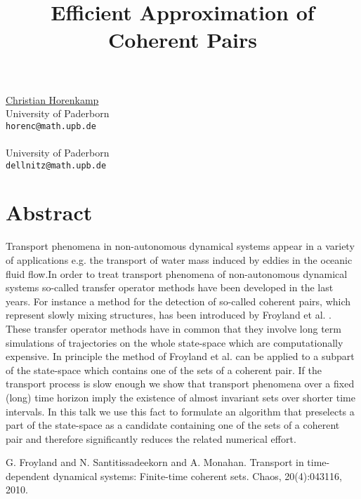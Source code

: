 \title{Efficient Approximation of Coherent Pairs}
\author{}  \institute{}
\maketitle
\begin{center}
{\large \underline{Christian Horenkamp}}\\
University of Paderborn\\
{\tt horenc@math.upb.de}
\\ \vspace{4mm}{\large Michael Dellnitz}\\
University of Paderborn\\
{\tt dellnitz@math.upb.de}

\end{center}

\section*{Abstract}

Transport phenomena in non-autonomous dynamical systems appear in a variety of applications e.g. the transport of water mass induced by eddies in the oceanic fluid flow.In order to treat transport phenomena of non-autonomous dynamical systems so-called transfer operator methods have been developed in the last years. For instance a method for the detection of so-called coherent pairs, which represent slowly mixing structures, has been introduced by Froyland et al. \cite{FroSanMon10}. These transfer operator methods have in common that they involve long term simulations of trajectories on the whole state-space which are computationally expensive. In principle the method of Froyland et al. can be applied to a subpart of the state-space which contains one of the sets of a coherent pair. If the transport process is slow enough we show that transport phenomena over a fixed (long) time horizon imply the existence of almost invariant sets over shorter time intervals. In this talk we use this fact to formulate an algorithm that preselects a part of the state-space as a candidate containing one of the sets of a coherent pair and therefore significantly reduces the related numerical effort.


\begin{thebibliography}{10}

{\sc G. Froyland and N. Santitissadeekorn and A. Monahan}. {Transport in time-dependent dynamical systems: Finite-time coherent sets}. Chaos, 20(4):043116, 2010.

\end{thebibliography}
